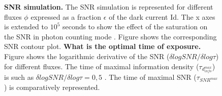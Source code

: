 \begin{figure}[htbp]
\begin{center}
\caption{{\bf SNR simulation.} The SNR simulation is represented for different fluxes $\phi$ expressed as a fraction $\epsilon$ of the dark current Id. The x axes is extended to $10^5$ seconds to show the effect of the saturation on the SNR in photon counting mode . Figure   shows the corresponding SNR contour plot.
{\bf What is the optimal time of exposure.}  Figure  shows the logarithmic derivative of the SNR ($\delta logSNR/\delta log\tau$) for different fluxes. The time of maximal information density ($\tau_{d_{info}^{max}}$) is such as  $\delta logSNR/\delta log\tau = 0,5$  . The time of maximal SNR  ($\tau_{SNR^{max}}$) is comparatively represented. }
\label{fig:SNRTau}
\end{center}
\end{figure}


